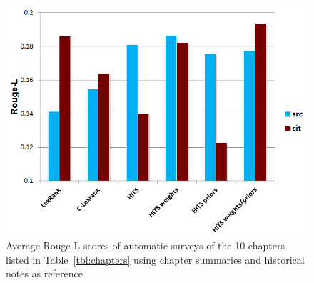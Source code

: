\begin{figure}
\centering
\includegraphics[width=\columnwidth]{images/rougeL}
\caption{Average Rouge-L scores of automatic surveys of the 10 chapters listed in Table~\ref{tbl:chapters}  using chapter summaries and historical notes as reference }\label{fig:rougel}
\end{figure}

